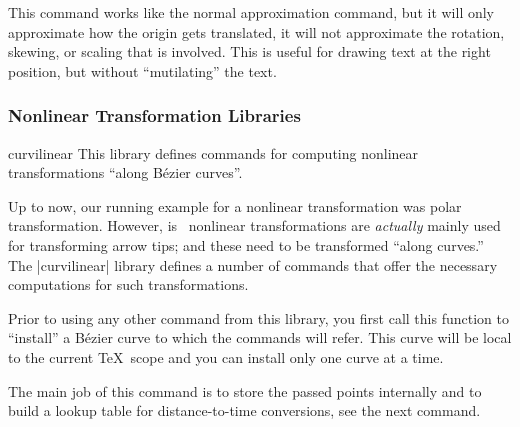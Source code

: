 \begin{command}{\pgfapproximatenonlineartranslation}
  This command works like the normal approximation command, but it
  will only approximate how the origin gets translated, it will not
  approximate the rotation, skewing, or scaling that is involved. This
  is useful for drawing text at the right position, but without
  ``mutilating'' the text.
\begin{codeexample}[]
\end{codeexample}  
\end{command}


\subsubsection{Nonlinear Transformation Libraries}
\label{section-library-curvilinear}

\begin{pgflibrary}{curvilinear}
  This library defines commands for computing nonlinear
  transformations ``along B\'ezier curves''.
\end{pgflibrary}

Up to now, our running example for a nonlinear transformation was
polar transformation. However, is \pgfname\ nonlinear transformations
are \emph{actually} mainly used for transforming arrow tips; and these
need to be transformed ``along curves.'' The |curvilinear| library
defines a number of commands that offer the necessary computations for
such transformations.

\begin{command}{\pgfsetcurvilinearbeziercurve{}}
  Prior to using any other command from this library, you first call
  this function to ``install'' a B\'ezier curve to which the commands
  will refer. This curve will be local to the current \TeX\ scope and
  you can install only one curve at a time.

  The main job of this command is to store the passed points
  internally and to build a lookup table for distance-to-time
  conversions, see the next command.
\begin{codeexample}
\pgfsetcurvilinearbeziercurve
  {\pgfpointorigin}
  {\pgfpoint{1cm}{1cm}}
  {\pgfpoint{2cm}{1cm}}
  {\pgfpoint{3cm}{0cm}}
\end{codeexample}
\end{command}


